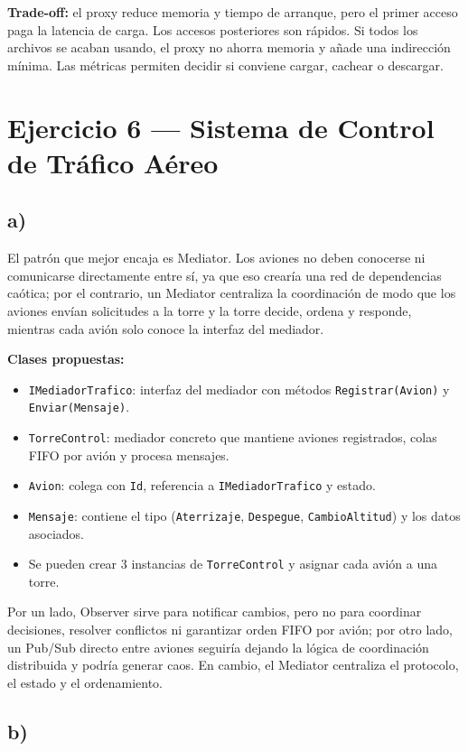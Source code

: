 \documentclass[11pt,a4paper]{article}
\begin{document}
\textbf{Trade-off:} el proxy reduce memoria y tiempo de arranque, pero el primer acceso paga la latencia de carga. Los accesos posteriores son rápidos. Si todos los archivos se acaban usando, el proxy no ahorra memoria y añade una indirección mínima. Las métricas permiten decidir si conviene cargar, cachear o descargar.

\section*{Ejercicio 6 — Sistema de Control de Tráfico Aéreo}

\subsection*{a)}

El patrón que mejor encaja es Mediator. Los aviones no deben conocerse ni comunicarse directamente entre sí, ya que eso crearía una red de dependencias caótica; por el contrario, un Mediator centraliza la coordinación de modo que los aviones envían solicitudes a la torre y la torre decide, ordena y responde, mientras cada avión solo conoce la interfaz del mediador.

\textbf{Clases propuestas:}
\begin{itemize}
    \item \texttt{IMediadorTrafico}: interfaz del mediador con métodos \texttt{Registrar(Avion)} y \texttt{Enviar(Mensaje)}.
    \item \texttt{TorreControl}: mediador concreto que mantiene aviones registrados, colas FIFO por avión y procesa mensajes.
    \item \texttt{Avion}: colega con \texttt{Id}, referencia a \texttt{IMediadorTrafico} y estado.
    \item \texttt{Mensaje}: contiene el tipo (\texttt{Aterrizaje}, \texttt{Despegue}, \texttt{CambioAltitud}) y los datos asociados.
    \item Se pueden crear 3 instancias de \texttt{TorreControl} y asignar cada avión a una torre.
\end{itemize}

Por un lado, Observer sirve para notificar cambios, pero no para coordinar decisiones, resolver conflictos ni garantizar orden FIFO por avión; por otro lado, un Pub/Sub directo entre aviones seguiría dejando la lógica de coordinación distribuida y podría generar caos. En cambio, el Mediator centraliza el protocolo, el estado y el ordenamiento.

\subsection*{b)}
\end{document}

